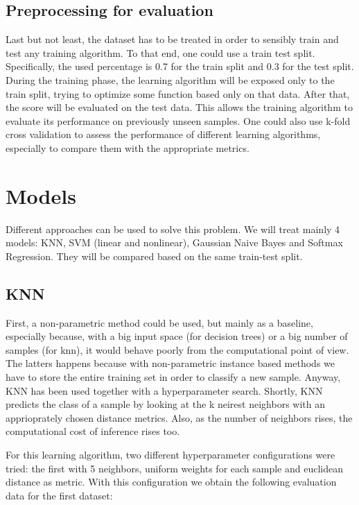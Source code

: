 \documentclass[12pt,a4paper,oneside]{article}
\begin{document}
\subsection{Preprocessing for evaluation}

Last but not least, the dataset has to be treated in order to sensibly train and
test any training algorithm. To that end, one could use a train test split.
Specifically, the used percentage is 0.7 for the train split and 0.3 for the
test split. During the training phase, the learning algorithm will be exposed
only to the train split, trying to optimize some function based only on that
data. After that, the score will be evaluated on the test data. This allows the
training algorithm to evaluate its performance on previously unseen samples. One
could also use k-fold cross validation to assess the performance of different
learning algorithms, especially to compare them with the appropriate metrics.


\section{Models}

Different approaches can be used to solve this problem. We will treat mainly 4
models: KNN, SVM (linear and nonlinear), Gaussian Naive Bayes and Softmax
Regression. They will be compared based on the same train-test split.

\subsection{KNN}

First, a non-parametric method could be used, but mainly as a baseline,
especially because, with a big input space (for decision trees) or a big number
of samples (for knn), it would behave poorly from the computational point of
view. The latters happens because with non-parametric instance based methods we
have to store the entire training set in order to classify a new sample. Anyway,
KNN has been used together with a hyperparameter search. Shortly, KNN predicts
the class of a sample by looking at the k neirest neighbors with an
apprioprately chosen distance metrics. Also, as the number of neighbors rises,
the computational cost of inference rises too.

For this learning algorithm, two different hyperparameter configurations were
tried: the first with 5 neighbors, uniform weights for each sample and euclidean
distance as metric. With this configuration we obtain the following evaluation
data for the first dataset: 
\end{document}
